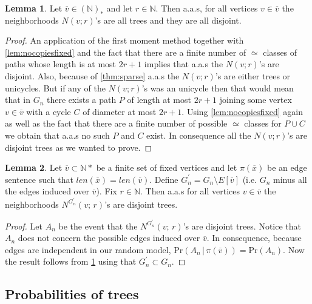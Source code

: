 \documentclass[12pt,notitlepage,a4paper]{article}
\theoremstyle{definition}
\newtheorem{lemma}{Lemma}[section]
\newcommand{\N}{\mathbb{N}}
\begin{document}
\begin{lemma} \label{lem:disjointtrees}
	Let $\overline{v}\in (\N)_*$ and let $r\in \N$. Then
	a.a.s, for all vertices $v\in \overline{v}$ the neighborhoods 
	$N(v;r)$'s are all trees and they are all disjoint. 
	
	\begin{proof}
		An application of the first moment method together with
		\cref{lem:nocopiesfixed} and the fact that there are a finite number
		of $\simeq$ classes of paths whose length is at most $2r+1$ implies that
		a.a.s the $N(v;r)$'s are disjoint. 
		Also, because of \cref{thm:sparse} a.a.s the $N(v;r)$'s are either 
		trees or unicycles. But if any of the $N(v;r)$'s was an unicycle then
		that would mean that in $G_n$ there exists a path $P$ of length at most
		$2r+1$ joining some vertex $v\in \overline{v}$
		with a cycle $C$ of diameter at most $2r+1$. Using \cref{lem:nocopiesfixed}
		again as well as the fact that there are a finite number of possible $\simeq$
		classes for
		$P\cup C$ we obtain that a.a.s no such $P$ and $C$ exist. 
		In consequence all the $N(v;r)$'s are disjoint trees as we wanted to
		prove. \end{proof}
\end{lemma}

\begin{lemma}\label{lem:far_away}
	Let $\overline{v} \subset \N*$ be a finite set of fixed vertices and let 
	$\pi(\overline{x})$ be an edge sentence such that
	$len(\overline{x})=len(\overline{v})$. 
	Define $G_n^\prime=G_n \setminus E[\overline{v}]$ (i.e. $G_n$ minus all the
	edges induced over $\overline{v}$). Fix $r\in \N$. 
	Then a.a.s for all vertices $v\in \overline{v}$ the neighborhoods
	$N^{G^\prime_n}(v;\,r)$'s are disjoint trees.  
\end{lemma}
\begin{proof}
	Let $A_n$ be the event that the $N^{G^\prime_n}(v;\,r)$'s are disjoint trees.  
	Notice that $A_n$ does not concern the possible edges
	induced over $\overline{v}$. In consequence, because edges are independent
	in our random model, 
	$\mathrm{Pr}\left(A_n \, | \, \pi(\overline{v})\right)
	=\mathrm{Pr}(A_n)$. Now the result follows from 
	\cref{lem:disjointtrees} using that $G^\prime_n\subset G_n$.  
\end{proof}







\subsection{Probabilities of trees}
\end{document}
